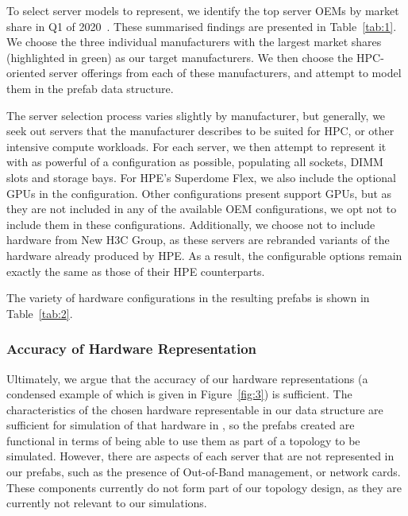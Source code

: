 \documentclass[11pt]{article}
\begin{document}
			To select server models to represent, we identify the top server OEMs by market share in Q1 of 2020~\cite{Macatee2020}. These summarised findings are presented in Table~\ref{tab:1}.
			We choose the three individual manufacturers with the largest market shares (highlighted in green) as our target manufacturers.
			We then choose the HPC-oriented server offerings from each of these manufacturers, and attempt to model them in the prefab data structure.
			
			The server selection process varies slightly by manufacturer, but generally, we seek out servers that the manufacturer describes to be suited for HPC, or other intensive compute workloads.
			For each server, we then attempt to represent it with as powerful of a configuration as possible, populating all sockets, DIMM slots and storage bays.
			For HPE's Superdome Flex, we also include the optional GPUs in the configuration.
			Other configurations present support GPUs, but as they are not included in any of the available OEM configurations, we opt not to include them in these configurations.
			Additionally, we choose not to include hardware from New H3C Group, as these servers are rebranded variants of the hardware already produced by HPE.
			As a result, the configurable options remain exactly the same as those of their HPE counterparts.

			The variety of hardware configurations in the resulting prefabs is shown in Table~\ref{tab:2}.



		\subsubsection{Accuracy of Hardware Representation}
			Ultimately, we argue that the accuracy of our hardware representations (a condensed example of which is given in Figure~\ref{fig:3}) is sufficient.
			The characteristics of the chosen hardware representable in our data structure are sufficient for simulation of that hardware in \opendc{}, so the prefabs created are functional in terms of being able to use them as part of a topology to be simulated.
			However, there are aspects of each server that are not represented in our prefabs, such as the presence of Out-of-Band management, or network cards.
			These components currently do not form part of our topology design, as they are currently not relevant to our simulations.
\end{document}
